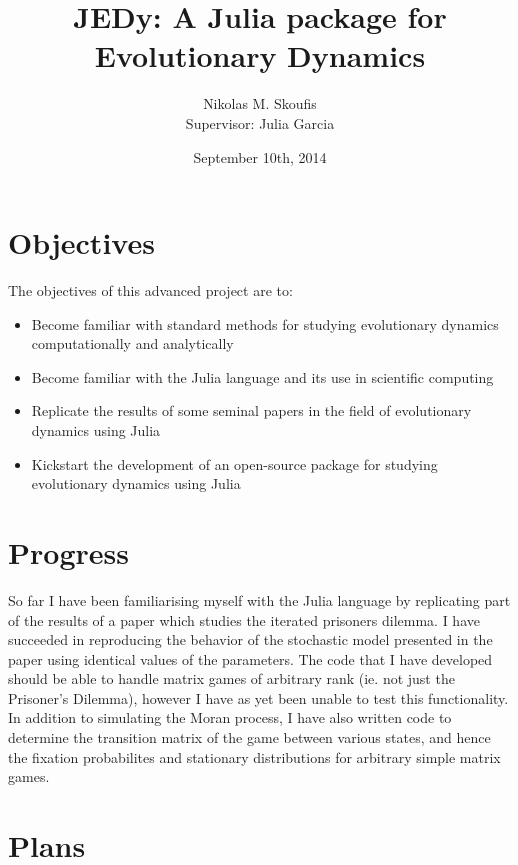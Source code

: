 \documentclass[a4paper,11pt]{article}
\begin{document}
\title{JEDy: A Julia package for Evolutionary Dynamics}
\author{Nikolas M. Skoufis \\ Supervisor: Julia Garcia}
\date{September 10th, 2014}

\maketitle

\section*{Objectives}

The objectives of this advanced project are to:

\begin{itemize}
        
    \item Become familiar with standard methods for studying evolutionary dynamics computationally and analytically
    \item Become familiar with the Julia \cite{julia} language and its use in scientific computing
    \item Replicate the results of some seminal papers in the field of evolutionary dynamics using Julia
    \item Kickstart the development of an open-source package for studying evolutionary dynamics using Julia

\end{itemize}

\section*{Progress}

So far I have been familiarising myself with the Julia language by replicating part of the results of a paper \cite{imhofetal} which studies the iterated prisoners dilemma.
I have succeeded in reproducing the behavior of the stochastic model presented in the paper using identical values of the parameters.
The code that I have developed should be able to handle matrix games of arbitrary rank (ie. not just the Prisoner's Dilemma), however I have as yet been unable to test this functionality.
In addition to simulating the Moran process, I have also written code to determine the transition matrix of the game between various states, and hence the fixation probabilites and stationary distributions for arbitrary simple matrix games.

\section*{Plans}
\end{document}
